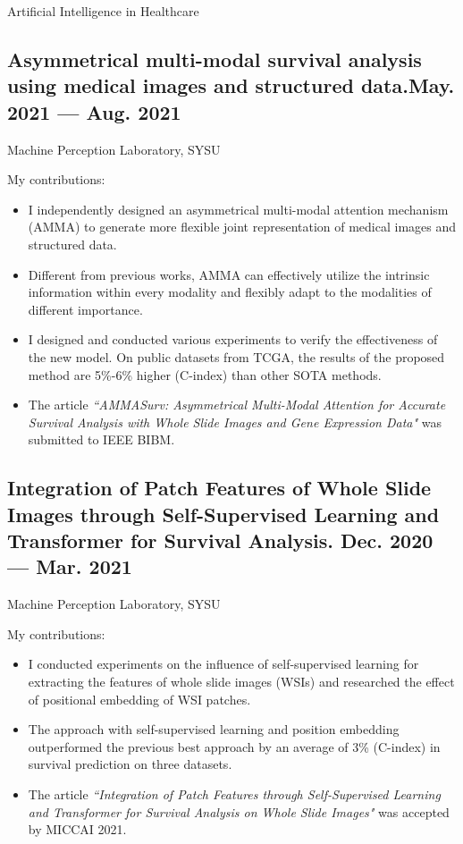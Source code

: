 \documentclass[a4,11pt]{article}
\newcommand{\subtext}[1]{
#1\par\vspace{-0.2cm}}
\begin{document}
\centerline{\textcolor{UI_blue}{Artificial Intelligence in Healthcare}}
\vspace {6pt}
\subsection*{Asymmetrical multi-modal survival analysis using medical images and structured data.\hfill May. 2021 --- Aug. 2021} 
\subtext{Machine Perception Laboratory, SYSU }
\vspace {6pt}
My contributions:
    \begin{itemize}[topsep = 0 pt, itemsep = 0 pt, parsep = 1 pt]
       \item I independently designed an asymmetrical multi-modal attention mechanism (AMMA) to generate more flexible joint representation of medical images and structured data. 
		\item Different from previous works, AMMA can effectively utilize the intrinsic information within every modality and flexibly adapt to the modalities of different importance.
		\item I designed and conducted various experiments to verify the effectiveness of the new model.  On public datasets from TCGA, the results of the proposed method are 5\%-6\% higher (C-index) than other SOTA methods. 
        \item The article \textit{``AMMASurv: Asymmetrical Multi-Modal Attention for Accurate Survival Analysis with Whole Slide Images and Gene Expression Data"} was submitted to IEEE BIBM.
    \end{itemize}


\subsection*{Integration of Patch Features of Whole Slide Images through Self-Supervised Learning and Transformer for Survival Analysis. \hfill Dec. 2020 --- Mar. 2021}
\subtext{Machine Perception Laboratory, SYSU}  
\vspace {6pt}
My contributions:
    \begin{itemize}[topsep = 0 pt, itemsep = 0 pt, parsep = 1 pt]
        \item I conducted experiments on the influence of self-supervised learning for extracting the features of whole slide images (WSIs) and researched the effect of positional embedding of WSI patches. 
		\item The approach with self-supervised learning and position embedding outperformed the previous best approach by an average of 3\% (C-index) in survival prediction on three datasets.
		\item The article \textit{``Integration of Patch Features through Self-Supervised Learning and Transformer for Survival Analysis on Whole Slide Images"} was accepted by MICCAI 2021.
    \end{itemize}
\end{document}

